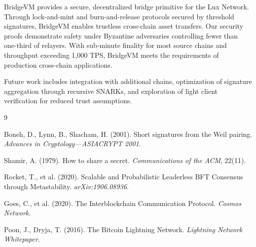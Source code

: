 \documentclass[11pt,a4paper]{article}
\theoremstyle{definition}
\begin{document}
BridgeVM provides a secure, decentralized bridge primitive for the Lux Network. Through lock-and-mint and burn-and-release protocols secured by threshold signatures, BridgeVM enables trustless cross-chain asset transfers. Our security proofs demonstrate safety under Byzantine adversaries controlling fewer than one-third of relayers. With sub-minute finality for most source chains and throughput exceeding 1,000 TPS, BridgeVM meets the requirements of production cross-chain applications.

Future work includes integration with additional chains, optimization of signature aggregation through recursive SNARKs, and exploration of light client verification for reduced trust assumptions.


\begin{thebibliography}{9}

Boneh, D., Lynn, B., Shacham, H. (2001). Short signatures from the Weil pairing. \textit{Advances in Cryptology---ASIACRYPT 2001}.

Shamir, A. (1979). How to share a secret. \textit{Communications of the ACM}, 22(11).

Rocket, T., et al. (2020). Scalable and Probabilistic Leaderless BFT Consensus through Metastability. \textit{arXiv:1906.08936}.

Goes, C., et al. (2020). The Interblockchain Communication Protocol. \textit{Cosmos Network}.

Poon, J., Dryja, T. (2016). The Bitcoin Lightning Network. \textit{Lightning Network Whitepaper}.

\end{thebibliography}
\end{document}
